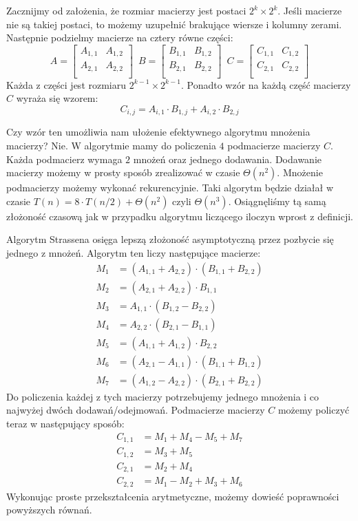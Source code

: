 Zacznijmy od założenia, że rozmiar macierzy jest postaci $2^k \times 2^k$.
Jeśli macierze nie są takiej postaci, to możemy uzupełnić brakujące wiersze i kolumny zerami.
Następnie podzielmy macierze na cztery równe części:
\[
  A = 
  \begin{bmatrix}
    A_{1,1} & A_{1,2} \\
    A_{2,1} & A_{2,2} \\
  \end{bmatrix} \enspace  
  B = 
  \begin{bmatrix}
    B_{1,1} & B_{1,2} \\
    B_{2,1} & B_{2,2} \\
  \end{bmatrix} \enspace
  C = 
  \begin{bmatrix}
    C_{1,1} & C_{1,2} \\
    C_{2,1} & C_{2,2} \\
  \end{bmatrix}
\]
Każda z części jest rozmiaru $2^{k-1} \times 2^{k-1}$.
Ponadto wzór na każdą część macierzy $C$ wyraża się wzorem:
\[
 C_{i,j} = A_{i,1} \cdot B_{1,j} + A_{i,2} \cdot B_{2,j}
\]

Czy wzór ten umożliwia nam ułożenie efektywnego algorytmu mnożenia macierzy?
Nie.
W algorytmie mamy do policzenia $4$ podmacierze macierzy $C$.
Każda podmacierz wymaga $2$ mnożeń oraz jednego dodawania.
Dodawanie macierzy możemy w prosty sposób zrealizować w czasie $\Theta(n^2)$.
Mnożenie podmacierzy możemy wykonać rekurencyjnie.
Taki algorytm będzie działał w czasie $T(n) = 8\cdot T(n/2) + \Theta(n^2)$ czyli $\Theta(n^3)$.
Osiągnęliśmy tą samą złożoność czasową jak w przypadku algorytmu liczącego iloczyn wprost z definicji.

Algorytm Strassena osięga lepszą złożoność asymptotyczną przez pozbycie się jednego z mnożeń.
Algorytm ten liczy następujące macierze:
\begin{align*}
 M_1 &= (A_{1,1} + A_{2,2}) \cdot (B_{1,1} + B_{2,2}) \\
 M_2 &= (A_{2,1} + A_{2,2}) \cdot B_{1,1} \\
 M_3 &= A_{1,1} \cdot (B_{1,2} - B_{2,2}) \\
 M_4 &= A_{2,2} \cdot (B_{2,1} - B_{1,1}) \\
 M_5 &= (A_{1,1} + A_{1,2}) \cdot B_{2,2} \\
 M_6 &= (A_{2,1} - A_{1,1}) \cdot (B_{1,1} + B_{1,2}) \\
 M_7 &= (A_{1,2} - A_{2,2}) \cdot (B_{2,1} + B_{2,2})
\end{align*}
Do policzenia każdej z tych macierzy potrzebujemy jednego mnożenia i co najwyżej dwóch dodawań/odejmowań.
Podmacierze macierzy $C$ możemy policzyć teraz w następujący sposób:
\begin{align*}
 C_{1,1} &= M_1 + M_4 - M_5 + M_7 \\
 C_{1,2} &= M_3 + M_5 \\
 C_{2,1} &= M_2 + M_4 \\
 C_{2,2} &= M_1 - M_2 + M_3 + M_6
\end{align*}
Wykonując proste przekształcenia arytmetyczne, możemy dowieść poprawności powyższych równań.

